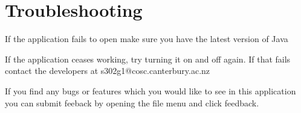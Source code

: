 \section{Troubleshooting}

If the application fails to open make sure you have the latest version of Java

If the application ceases working, try turning it on and off again. If that fails contact the developers at s302g1@cosc.canterbury.ac.nz

If you find any bugs or features which you would like to see in this application you can submit feeback by opening the file menu and click feedback.